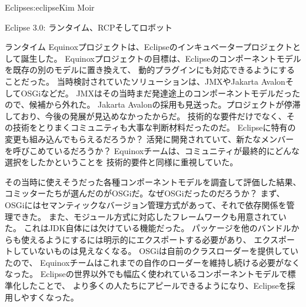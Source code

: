 \begin{aosachapter}{Eclipse}{s:eclipse}{Kim Moir}
\begin{aosasect1}{Eclipse 3.0: ランタイム、RCPそしてロボット}
\begin{aosasect2}{ランタイム}
Equinoxプロジェクトは、Eclipseのインキュベータープロジェクトとして誕生した。
Equinoxプロジェクトの目標は、Eclipseのコンポーネントモデルを既存の別のモデルに置き換えて、
動的プラグインにも対応できるようにすることだった。
当時検討されていたソリューションは、JMXやJakarta AvalonそしてOSGiなどだ。
JMXはその当時まだ発達途上のコンポーネントモデルだったので、候補から外れた。
Jakarta Avalonの採用も見送った。プロジェクトが停滞しており、今後の発展が見込めなかったからだ。
技術的な要件だけでなく、その技術をとりまくコミュニティも大事な判断材料だったのだ。
Eclipseに特有の変更も組み込んでもらえるだろうか？
活発に開発されていて、新たなメンバーを呼びこめているだろうか？
Equinoxチームは、コミュニティが最終的にどんな選択をしたかということを
技術的要件と同様に重視していた。

その当時に使えそうだった各種コンポーネントモデルを調査して評価した結果、
コミッターたちが選んだのがOSGiだ。なぜOSGiだったのだろうか？
まず、OSGiにはセマンティックなバージョン管理方式があって、それで依存関係を管理できた。
また、モジュール方式に対応したフレームワークも用意されていた。
これはJDK自体には欠けている機能だった。
パッケージを他のバンドルからも使えるようにするには明示的にエクスポートする必要があり、
エクスポートしていないものは見えなくなる。
OSGiは自前のクラスローダーを提供していたので、
Equinoxチームはこれまでの自作のローダーを維持し続ける必要がなくなった。
Eclipseの世界以外でも幅広く使われているコンポーネントモデルで標準化したことで、
より多くの人たちにアピールできるようになり、Eclipseを採用しやすくなった。


\end{aosasect2}
\end{aosasect1}
\end{aosachapter}

